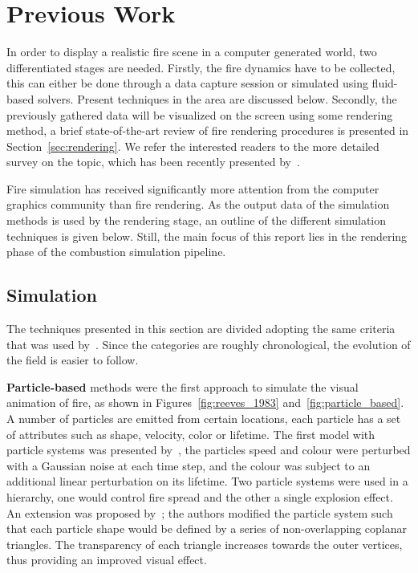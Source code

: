 \chapter{Previous Work}
\label{ch:previous_work}

In order to display a realistic fire scene in a computer generated world, two differentiated stages are needed.
Firstly, the fire dynamics have to be collected, this can either be done through a data capture session or simulated using fluid-based solvers.
Present techniques in the area are discussed below. 
Secondly, the previously gathered data will be visualized on the screen using some rendering method, a brief state-of-the-art review of fire rendering procedures is presented in Section~\ref{sec:rendering}.
We refer the interested readers to the more detailed survey on the topic, which has been recently presented by~\cite{Huang:2014}.

Fire simulation has received significantly more attention from the computer graphics community than fire rendering.
As the output data of the simulation methods is used by the rendering stage, an outline of the different simulation techniques is given below. 
Still, the main focus of this report lies in the rendering phase of the combustion simulation pipeline.

\section{Simulation}
\label{sec:simulation}


The techniques presented in this section are divided adopting the same criteria that was used by~\cite{Huang:2014}.
Since the categories are roughly chronological, the evolution of the field is easier to follow.

\textbf{Particle-based} methods were the first approach to simulate the visual animation of fire, as shown in Figures~\ref{fig:reeves_1983} and~\ref{fig:particle_based}.
A number of particles are emitted from certain locations, each particle has a set of attributes such as shape, velocity, color or lifetime.
The first model with particle systems was presented by~\cite{Reeves:1983}, the particles speed and colour were perturbed with a Gaussian noise at each time step, and the colour was subject to an additional linear perturbation on its lifetime.
Two particle systems were used in a hierarchy, one would control fire spread and the other a single explosion effect.
An extension was proposed by~\cite{Perry:1994}; the authors modified the particle system such that each particle shape would be defined by a series of non-overlapping coplanar triangles.
The transparency of each triangle increases towards the outer vertices, thus providing an improved visual effect.


